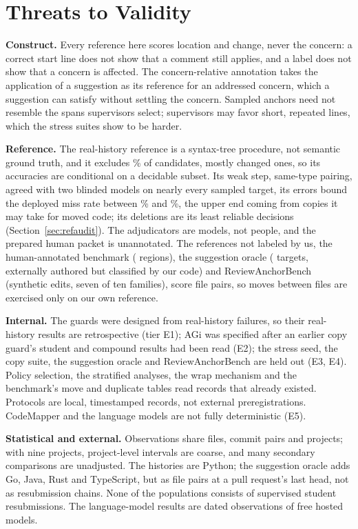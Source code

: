 \section{Threats to Validity}\label{sec:threats}
\textbf{Construct.} Every reference here scores location and change, never the concern: a correct start line does not show that a comment still applies, and a  label does not show that a concern is affected. The concern-relative annotation takes the application of a suggestion as its reference for an addressed concern, which a suggestion can satisfy without settling the concern. Sampled anchors need not resemble the spans supervisors select; supervisors may favor short, repeated lines, which the stress suites show to be harder.

\textbf{Reference.} The real-history reference is a syntax-tree procedure, not semantic ground truth, and it excludes \rExcludedPct\% of candidates, mostly changed ones, so its accuracies are conditional on a decidable subset. Its weak step, same-type pairing, agreed with two blinded models on nearly every sampled target, its errors bound the deployed miss rate between \% and \%, the upper end coming from copies it may take for moved code; its deletions are its least reliable decisions (Section~\ref{sec:refaudit}). The adjudicators are models, not people, and the prepared human packet is unannotated. The references not labeled by us, the human-annotated benchmark (\cExtHumN{} regions), the suggestion oracle (\wkUnits{} targets, externally authored but classified by our code) and ReviewAnchorBench (synthetic edits, seven of ten families), score file pairs, so moves between files are exercised only on our own reference.

\textbf{Internal.} The guards were designed from real-history failures, so their real-history results are retrospective (tier E1); AGi was specified after an earlier copy guard's student and compound results had been read (E2); the stress seed, the copy suite, the suggestion oracle and ReviewAnchorBench are held out (E3, E4). Policy selection, the stratified analyses, the wrap mechanism and the benchmark's move and duplicate tables read records that already existed. Protocols are local, timestamped records, not external preregistrations. CodeMapper and the language models are not fully deterministic (E5).

\textbf{Statistical and external.} Observations share files, commit pairs and projects; with nine projects, project-level intervals are coarse, and many secondary comparisons are unadjusted. The histories are Python; the suggestion oracle adds Go, Java, Rust and TypeScript, but as file pairs at a pull request's last head, not as resubmission chains. None of the populations consists of supervised student resubmissions. The language-model results are dated observations of free hosted models.


